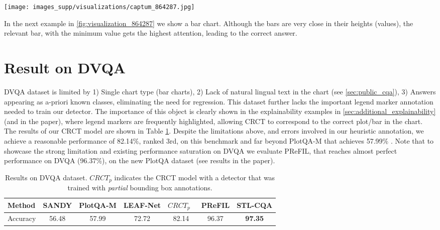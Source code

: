 \documentclass[runningheads]{llncs}
\newcommand\our[1][]{CRCT\xspace}
\begin{document}
\begin{figure*}[ht]
\begin{center}
\texttt{[image: images\_supp/visualizations/captum\_864287.jpg]}
\end{center}
   \caption{Explainability visualizations for a PlotQA test sample. Q: {\it In which year was the persistence rate of female students minimum?}, Ground truth: 1982. \our: \textcolor{ForestGreen}{1982}. For better visibility, we overlay the visualization as colored bounding box around the bars. Note how green bars related to {\it Female} achieve higher attention with the correct bar receiving the highest attention.}
\label{fig:visualization_864287}
\end{figure*}
In the next example in \cref{fig:visualization_864287} we show a bar chart. Although the bars are very close in their heights (values), the relevant bar, with the minimum value gets the highest attention, leading to the correct answer.




\section{Result on DVQA}
DVQA dataset is limited by 1) Single chart type (bar charts), 2) Lack of natural lingual text in the chart (see \cref{sec:public_cqa}), 3) Answers appearing as a-priori known classes, eliminating the need for regression. This dataset further lacks the important legend marker annotation needed to train our detector. The importance of this object is clearly shown in the explainability examples in \cref{sec:additional_explainability} (and in the paper), where legend markers are frequently highlighted, allowing \our to correspond to the correct plot/bar in the chart. The results of our CRCT model are shown in Table \ref{table:dvqa_results}.
Despite the limitations above, and errors involved in our heuristic annotation, we achieve a reasonable performance of 82.14\%, ranked 3rd, on this benchmark and far beyond PlotQA-M that achieves 57.99\% . Note that to showcase the strong limitation and existing performance saturation on DVQA we evaluate PReFIL, that reaches almost perfect performance on DVQA (96.37\%), on the new PlotQA dataset (see results in the paper).
\begin{table}[ht]
\centering
\caption{Results on DVQA dataset. ${CRCT}_p$ indicates the \our model with a detector that was trained with {\it partial} bounding box annotations.}
\vspace{5mm}
\begin{tabular}{@{}l|llllll@{}}
\toprule
Method & SANDY\cite{dvqa} & PlotQA-M\cite{plotqa} & LEAF-Net\cite{chaudhry2019leafqa} & ${CRCT}_p$~& PReFIL\cite{prefil} & STL-CQA\cite{chartqa} \\ \midrule
Accuracy & \multicolumn{1}{c}{56.48} & \multicolumn{1}{c}{57.99} & \multicolumn{1}{c}{72.72} & \multicolumn{1}{c}{82.14} & \multicolumn{1}{c}{96.37} & \multicolumn{1}{c}{{\bf 97.35}} \\ \bottomrule
\end{tabular}
\label{table:dvqa_results}
\end{table}
\end{document}
